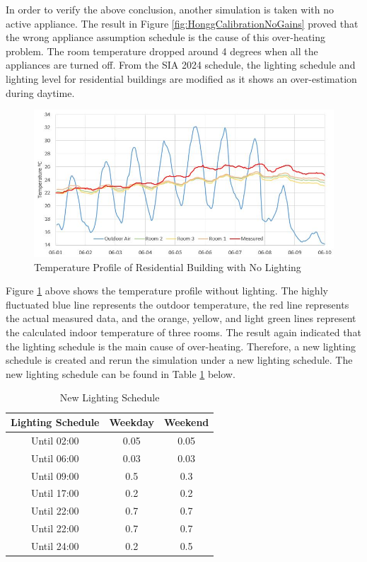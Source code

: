 \documentclass[a4paper, oneside]{discothesis}
\begin{document}
			In order to verify the above conclusion, another simulation is taken with no active appliance. The result in Figure \ref{fig:HonggCalibrationNoGains} proved that the wrong appliance assumption schedule is the cause of this over-heating problem. The room temperature dropped around 4 degrees when all the appliances are turned off. From the SIA 2024 schedule, the lighting schedule and lighting level for residential buildings are modified as it shows an over-estimation during daytime. \\

			\begin{figure}[H]
			\centering
			\includegraphics[scale=0.75]{Hongg_Clibration_03NoLight.JPG}
			\caption{Temperature Profile of Residential Building with No Lighting}
			\label{fig:HonggerCalibrationNoLight}
			\end{figure}

			Figure \ref{fig:HonggerCalibrationNoLight} above shows the temperature profile without lighting. The highly fluctuated blue line represents the outdoor temperature, the red line represents the actual measured data, and the orange, yellow, and light green lines represent  the calculated indoor temperature of three rooms. The result again indicated that the lighting schedule is the main cause of over-heating. Therefore, a new lighting schedule is created and rerun the simulation under a new lighting schedule. The new lighting schedule can be found in Table \ref{tab:HonggLightingCtrl} below.
			
        	\begin{table}[htbp]
        	\centering
        	\caption{New Lighting Schedule}
        	    \begin{tabular}{ccc}
        	    \toprule
        	    Lighting Schedule & Weekday & Weekend\\
        	    \midrule
                Until 02:00 & 0.05 & 0.05 \\
                Until 06:00 & 0.03 & 0.03\\
                Until 09:00 & 0.5 & 0.3\\
                Until 17:00 & 0.2 & 0.2\\
                Until 22:00 & 0.7 & 0.7\\
                Until 22:00 & 0.7 & 0.7\\
                Until 24:00 & 0.2 & 0.5\\
        	    \bottomrule
        	    \end{tabular}%
        	  \label{tab:HonggLightingCtrl}%
        	\end{table}%
			
\end{document}
